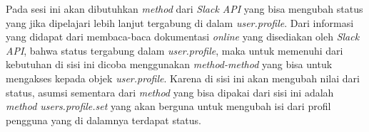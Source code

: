 Pada sesi ini akan dibutuhkan \textit{method} dari \textit{Slack API} yang bisa mengubah status yang jika dipelajari lebih lanjut tergabung di dalam \textit{user.profile}. Dari informasi yang didapat dari membaca-baca dokumentasi \textit{online} yang disediakan oleh \textit{Slack API}, bahwa status tergabung dalam \textit{user.profile}, maka untuk memenuhi dari kebutuhan di sisi ini dicoba menggunakan \textit{method-method} yang bisa untuk mengakses kepada objek \textit{user.profile}. Karena di sisi ini akan mengubah nilai dari status, asumsi sementara dari \textit{method} yang bisa dipakai dari sisi ini adalah \textit{method users.profile.set} yang akan berguna untuk mengubah isi dari profil pengguna yang di dalamnya terdapat status. 
